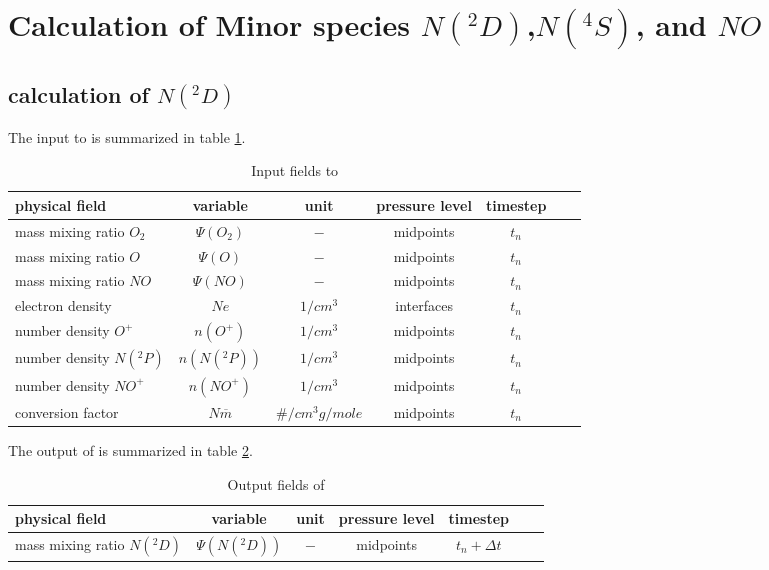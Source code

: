 %
\section{Calculation of Minor species $N(^2D)$,$N(^4S)$, and $NO$    }\label{cap:comp_n}
%
\subsection{calculation of $N(^2D)$}\label{subcap:comp_n2d}
%
The input to  is summarized in table
\ref{tab:input_comp_n2d}.
%
\begin{table}[tb]
\begin{tabular}{|p{3.5cm} ||c|c|c|c|c|c|} \hline
physical field               & variable        & unit&pressure
level& timestep
\\ \hline \hline
%
mass mixing ratio $O_2$ &       $\Psi(O_2)$              & $-$   &  midpoints & $t_n$\\
mass mixing ratio $O$ &         $\Psi(O  )$              & $-$   &  midpoints & $t_n$\\
mass mixing ratio $NO$ &       $\Psi(NO)$              & $-$   &  midpoints & $t_n$\\
electron density&       $Ne$              & $1/cm^3$   &  interfaces & $t_n$\\
number density $O^+$&       $n(O^+)$              & $1/cm^3$   &  midpoints & $t_n$\\
number density $N(^2P)$&       $n(N(^2P))$              & $1/cm^3$   &  midpoints & $t_n$\\
number density $NO^+$&       $n(NO^+)$              & $1/cm^3$   &  midpoints & $t_n$\\
conversion factor&       $N \overline{m}$              & $\#/cm^3
g/mole$   &  midpoints & $t_n$
 \\ \hline
\end{tabular}
\caption{Input fields to }
\label{tab:input_comp_n2d}
\end{table}
%
The output of  is summarized in table
\ref{tab:output_comp_n2d}.
%
\begin{table}[tb]
\begin{tabular}{|p{3.5cm} ||c|c|c|c|c|c|} \hline
physical field               & variable        & unit&pressure
level& timestep \\ \hline \hline mass mixing ratio $N(^2D)$ &
$\Psi(N(^2D))$ & $-$ & midpoints & $t_n+\Delta t$
\\ \hline \hline
\end{tabular}
\caption{Output fields of }
\label{tab:output_comp_n2d}
\end{table}
